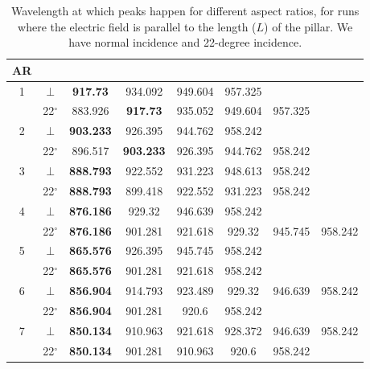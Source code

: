 \begin{table}
    \begin{center}
      \caption{Wavelength at which peaks happen for different aspect ratios, for runs where the electric
      field is parallel to the length ($L$) of the pillar. We have normal incidence and 22-degree incidence.}
      \label{tab:ar_peaks}
      \begin{tabular}{c c c c c c c c}
        \textbf{AR} \\
        \hline
        \multirow{2}{*}{1} & $\perp$ & \textbf{917.73} & 934.092 & 949.604 & 957.325 \\ %
        & 22$^{\circ}$ & 883.926 & \textbf{917.73} & 935.052 & 949.604 & 957.325 \\ %
        \hline
        \multirow{2}{*}{2} & $\perp$ & \textbf{903.233} & 926.395 & 944.762 & 958.242 \\ %
        & 22$^{\circ}$ & 896.517 & \textbf{903.233} & 926.395 & 944.762 & 958.242 \\ %
        \hline
        \multirow{2}{*}{3} & $\perp$ & \textbf{888.793} & 922.552 & 931.223 & 948.613 & 958.242 \\ %
        & 22$^{\circ}$ & \textbf{888.793} & 899.418 & 922.552 & 931.223 & 958.242 \\ %
        \hline
        \multirow{2}{*}{4} & $\perp$ & \textbf{876.186} & 929.32 & 946.639 & 958.242 \\ %
        & 22$^{\circ}$ & \textbf{876.186} & 901.281 & 921.618 & 929.32 & 945.745 & 958.242 \\ %
        \hline
        \multirow{2}{*}{5} & $\perp$ & \textbf{865.576} & 926.395 & 945.745 & 958.242 \\ %
        & 22$^{\circ}$ & \textbf{865.576} & 901.281 & 921.618 & 958.242 \\ %
        \hline
        \multirow{2}{*}{6} & $\perp$ &  \textbf{856.904} & 914.793 & 923.489 & 929.32 & 946.639 & 958.242\\ %
        & 22$^{\circ}$ & \textbf{856.904} & 901.281 & 920.6 & 958.242\\ %
        \hline
        \multirow{2}{*}{7} & $\perp$ &  \textbf{850.134} & 910.963 & 921.618 & 928.372 & 946.639 & 958.242 \\ %
        & 22$^{\circ}$ & \textbf{850.134} & 901.281 & 910.963 & 920.6 & 958.242\\ %
        \hline
      \end{tabular}
    \end{center}
  \end{table}



